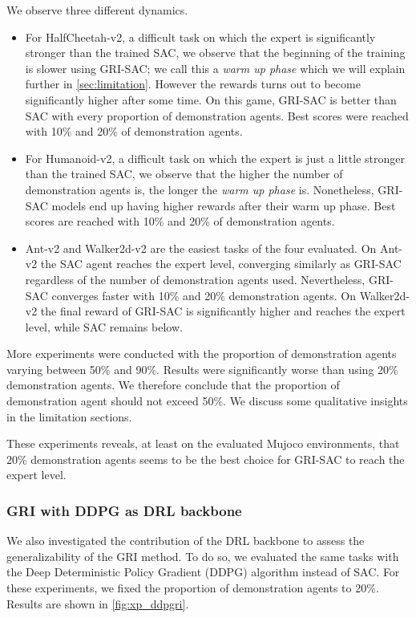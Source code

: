 \documentclass[letterpaper, 10 pt, conference]{ieeeconf}
\begin{document}
We observe three different dynamics. 
\begin{itemize}
    \itemsep0em 
    \item For HalfCheetah-v2, a difficult task on which the expert is significantly stronger than the trained SAC, we observe that the beginning of the training is slower using GRI-SAC; we call this a \textit{warm up phase} which we will explain further in \cref{sec:limitation}. However the rewards turns out to become significantly higher after some time. On this game, GRI-SAC is better than SAC with every proportion of demonstration agents. Best scores were reached with 10\% and 20\% of demonstration agents.
    \item For Humanoid-v2, a difficult task on which the expert is just a little stronger than the trained SAC, we observe that the higher the number of demonstration agents is, the longer the \textit{warm up phase} is. Nonetheless, GRI-SAC models end up having higher rewards after their warm up phase. Best scores are reached with 10\% and 20\% of demonstration agents.
    \item Ant-v2 and Walker2d-v2 are the easiest tasks of the four evaluated. On Ant-v2 the SAC agent reaches the expert level, converging similarly as GRI-SAC regardless of the number of demonstration agents used. Nevertheless, GRI-SAC converges faster with 10\% and 20\% demonstration agents. On Walker2d-v2 the final reward of GRI-SAC is significantly higher and reaches the expert level, while SAC remains below.
\end{itemize}

More experiments were conducted with the proportion of demonstration agents varying between 50\% and 90\%. Results were significantly worse than using 20\% demonstration agents. We therefore conclude that the proportion of demonstration agent should not exceed 50\%. We discuss some qualitative insights in the limitation sections.

These experiments reveals, at least on the evaluated Mujoco environments, that 20\% demonstration agents seems to be the best choice for GRI-SAC to reach the expert level. 




\subsubsection{GRI with DDPG as DRL backbone}
We also investigated the contribution of the DRL backbone to assess the generalizability of the GRI method. To do so, we evaluated the same tasks with the Deep Deterministic Policy Gradient (DDPG) algorithm \cite{ddpg} instead of SAC. For these experiments, we fixed the proportion of demonstration agents to 20\%. Results are shown in \cref{fig:xp_ddpgri}.
\end{document}
